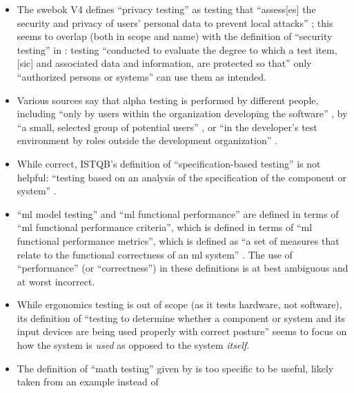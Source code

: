\begin{itemize}
      \item The \acs{swebok} V4 defines ``privacy testing'' as testing that ``assess[es]
            the security and privacy of users' personal data to prevent local
            attacks'' \citep[p.~5-10]{SWEBOK2024}; this seems to overlap
            (both in scope and name) with
            the definition of ``security testing'' in \citep{IEEE2022}: testing
            ``conducted to evaluate the degree to which a test item, [sic] and
            associated data and information, are protected so that'' only
            ``authorized persons or systems'' can use them as intended.
      \item Various sources say that alpha testing is performed by different
            people, including ``only by users within the organization
            developing the software'' \citep[p.~17]{IEEE2017}, by ``a small,
            selected group of potential users'' \citep[p.~5-8]{SWEBOK2024}, or
            ``in the developer's test environment by roles outside the
            development organization'' \citepISTQB{}.
            \ifnotpaper
      \item While correct, ISTQB's definition of ``specification-based testing''
            is not helpful: ``testing based on an analysis of the specification
            of the component or system'' \citepISTQB{}.
            \fi
      \item ``\acf{ml} model testing'' and ``\acs{ml} functional performance'' are defined
            in terms of ``\acs{ml} functional performance criteria'', which is defined
            in terms of ``\acs{ml} functional performance metrics'', which is defined
            as ``a set of measures that relate to the functional correctness of
            an \acs{ml} system'' \citepISTQB{}. The use of ``performance'' (or
            ``correctness'') in these definitions is at best ambiguous and at
            worst incorrect.
            \ifnotpaper
      \item While ergonomics testing is out of scope (as it tests hardware, not
            software), its definition of ``testing to determine whether a
            component or system and its input devices are being used properly
            with correct posture'' \citepISTQB{} seems to focus on how the
            system is \emph{used} as opposed to the system \emph{itself}.
      \item The definition of ``math testing'' given by \citetISTQB{} is
            too specific to be useful, likely taken from an example instead of

\end{itemize}

